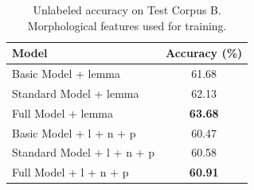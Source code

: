 \documentclass[11pt,letterpaper]{article}
\begin{document}
\begin{table}
\begin{center}
  \begin{tabular}{ l || c }
  \hline
  Model & Accuracy (\%)\\
  \hline
  Basic Model + lemma & 61.68 \\
  Standard Model + lemma & 62.13 \\
  Full Model + lemma & \textbf{63.68} \\
  \hline
  Basic Model + l + n + p& 60.47 \\
  Standard Model + l + n + p& 60.58 \\
  Full Model + l + n + p& \textbf{60.91} \\
  \hline
   \end{tabular}
\end{center}
\caption{Unlabeled accuracy on Test Corpus B. Morphological features used for training.}
\label{Five}
\end{table}














 

\newpage




\label{lastpage}
\end{document}
